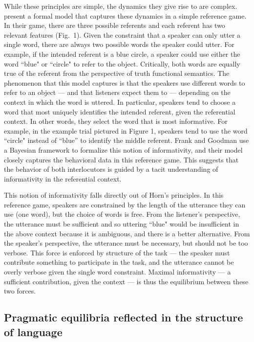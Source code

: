 \documentclass[man, noapacite, 12pt]{apa2}
\begin{document}
While these principles are simple, the dynamics they give rise to are complex.  present a formal model that captures these dynamics in a simple reference game. In their game, there are three possible referents and each referent has two relevant features (Fig.\ 1). Given the constraint that a speaker can only utter a single word, there are always two possible words the speaker could utter. For example, if the  intended referent is a blue circle, a speaker could use either the word ``blue" or ``circle" to refer to the object. Critically, both words are equally true of the referent from the perspective of truth functional semantics. The phenomenon that this model captures is that the speakers use different words to refer to an object --- and that listeners expect them to --- depending on the context in which the word is uttered. In particular, speakers  tend to choose a word that most uniquely identifies the intended referent, given the referential context. In other words, they select the word that is most informative. For example, in the example trial pictured in Figure 1, speakers tend to use the word ``circle" instead of ``blue'' to identify the middle referent.  Frank and Goodman use a Bayesian framework to formalize this notion of informativity, and their model closely captures the behavioral data in this reference game. This suggests that the behavior of both interlocutors is guided by a tacit understanding of informativity in the referential context. 

This notion of informativity falls directly out of Horn's principles. In this reference game, speakers are constrained by the length of the utterance they can use (one word), but the choice of words is free. From the listener's perspective, the utterance must be sufficient and so uttering ``blue" would be insufficient in the above context because it is ambiguous, and there is a better alternative. From the speaker's perspective, the utterance must be necessary, but should not be too verbose. This force is enforced by structure of the task --- the speaker must contribute something to participate in the task, and the utterance cannot be overly verbose given the single word constraint. Maximal informativity --- a sufficient contribution, given the context --- is thus the equilibrium between these two forces.

\subsection{Pragmatic equilibria reflected in the structure of language}
\end{document}

